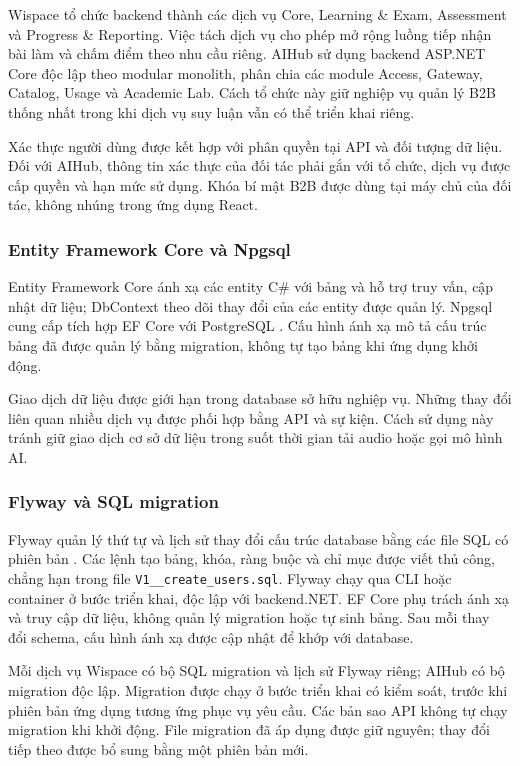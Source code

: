 Wispace tổ chức backend thành các dịch vụ Core, Learning \& Exam, Assessment và Progress \& Reporting. Việc tách dịch vụ cho phép mở rộng luồng tiếp nhận bài làm và chấm điểm theo nhu cầu riêng. AIHub sử dụng backend ASP.NET Core độc lập theo modular monolith, phân chia các module Access, Gateway, Catalog, Usage và Academic Lab. Cách tổ chức này giữ nghiệp vụ quản lý B2B thống nhất trong khi dịch vụ suy luận vẫn có thể triển khai riêng.

Xác thực người dùng được kết hợp với phân quyền tại API và đối tượng dữ liệu. Đối với AIHub, thông tin xác thực của đối tác phải gắn với tổ chức, dịch vụ được cấp quyền và hạn mức sử dụng. Khóa bí mật B2B được dùng tại máy chủ của đối tác, không nhúng trong ứng dụng React.

\subsubsection{Entity Framework Core và Npgsql}

Entity Framework Core ánh xạ các entity C\# với bảng và hỗ trợ truy vấn, cập nhật dữ liệu; DbContext theo dõi thay đổi của các entity được quản lý. Npgsql cung cấp tích hợp EF Core với PostgreSQL \parencite{ch7_npgsql}. Cấu hình ánh xạ mô tả cấu trúc bảng đã được quản lý bằng migration, không tự tạo bảng khi ứng dụng khởi động.

Giao dịch dữ liệu được giới hạn trong database sở hữu nghiệp vụ. Những thay đổi liên quan nhiều dịch vụ được phối hợp bằng API và sự kiện. Cách sử dụng này tránh giữ giao dịch cơ sở dữ liệu trong suốt thời gian tải audio hoặc gọi mô hình AI.

\subsubsection{Flyway và SQL migration}

Flyway quản lý thứ tự và lịch sử thay đổi cấu trúc database bằng các file SQL có phiên bản \parencite{ch4_flyway}. Các lệnh tạo bảng, khóa, ràng buộc và chỉ mục được viết thủ công, chẳng hạn trong file \texttt{V1\_\_create\_users.sql}. Flyway chạy qua CLI hoặc container ở bước triển khai, độc lập với backend.NET. EF Core phụ trách ánh xạ và truy cập dữ liệu, không quản lý migration hoặc tự sinh bảng. Sau mỗi thay đổi schema, cấu hình ánh xạ được cập nhật để khớp với database.

Mỗi dịch vụ Wispace có bộ SQL migration và lịch sử Flyway riêng; AIHub có bộ migration độc lập. Migration được chạy ở bước triển khai có kiểm soát, trước khi phiên bản ứng dụng tương ứng phục vụ yêu cầu. Các bản sao API không tự chạy migration khi khởi động. File migration đã áp dụng được giữ nguyên; thay đổi tiếp theo được bổ sung bằng một phiên bản mới.

